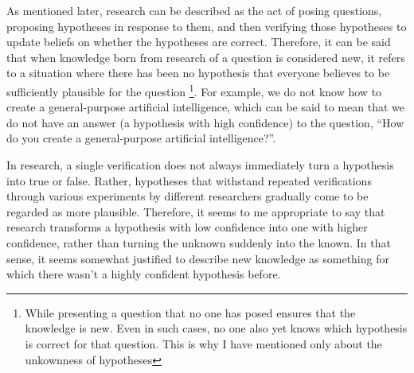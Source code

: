 As mentioned later, research can be described as the act of posing questions, proposing hypotheses in response to them, and then verifying those hypotheses to update beliefs on whether the hypotheses are correct. Therefore, it can be said that when knowledge born from research of a question is considered new, it refers to a situation where there has been no hypothesis that everyone believes to be sufficiently plausible for the question \footnote{
While presenting a question that no one has posed ensures that the knowledge is new. Even in such cases, no one also yet knows which hypothesis is correct for that question. This is why I have mentioned only about the unkownness of hypotheses
}. For example, we do not know how to create a general-purpose artificial intelligence, which can be said to mean that we do not have an answer (a hypothesis with high confidence) to the question, ``How do you create a general-purpose artificial intelligence?''.



In research, a single verification does not always immediately turn a hypothesis into true or false. Rather, hypotheses that withstand repeated verifications through various experiments by different researchers gradually come to be regarded as more plausible. Therefore, it seems to me appropriate to say that research transforms a hypothesis with low confidence into one with higher confidence, rather than turning the unknown suddenly into the known. In that sense, it seems somewhat justified to describe new knowledge as something for which there wasn't a highly confident hypothesis before.

